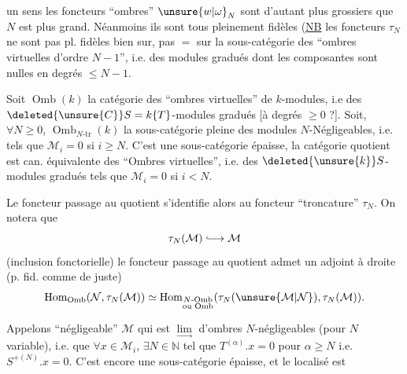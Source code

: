 un sens les foncteurs ``ombres'' $\unsure{w|\omega}_N$ sont d'autant plus grossiers que $N$ est plus grand. Néanmoins ils sont tous pleinement fidèles (\uline{NB} les foncteurs $\tau_N$ ne sont pas pl. fidèles bien sur, pas $=$ sur la sous-catégorie des ``ombres virtuelles d'ordre $N-1$'', i.e. des modules gradués dont les composantes sont nulles en degrés $\leq N-1$.

Soit $\operatorname{Omb}(k)$ la catégorie des ``ombres virtuelles'' de $k$-modules, i.e des $\deleted{\unsure{C}}S=k\{T\}$-modules gradués [à degrés $\geq0$ ?]. Soit, $\forall N\geq0$, $\operatorname{Omb}_{N\text{-}\mathrm{tr}}(k)$ la sous-catégorie pleine des modules $N$-Négligeables, i.e. tels que $\mathcal M_i=0$ si $i\geq N$. C'est une sous-catégorie épaisse, la catégorie quotient est can. équivalente   des ``Ombres virtuelles'', i.e. des $\deleted{\unsure{k}}S$-modules gradués tels que $\mathcal M_i=0$ si $i<N$.

Le foncteur passage au quotient s'identifie alors au foncteur ``troncature'' $\tau_N$. On notera que
\[
\tau_N(\mathcal M)\lhook\joinrel\longrightarrow\mathcal M
\]
(inclusion fonctorielle)  le foncteur  passage au quotient admet un adjoint à droite (p. fid. comme de juste)
\[
\operatorname{Hom}_{\mathrm{Omb}}(\mathcal N,\tau_N(\mathcal M))\simeq\operatorname{Hom}_{\substack{N\text{-}\mathrm{Omb}\\\text{ou }\mathrm{Omb}}}(\tau_N(\unsure{\mathcal M|\mathcal N}),\tau_N(\mathcal M)).
\]

Appelons ``négligeable''  $\mathcal M$ qui est $\underset{\longrightarrow}{\lim}$  d'ombres $N$-négligeables (pour $N$ variable), i.e.  que  $\forall x\in\mathcal M_i$, $\exists N\in\mathbb{N}$ tel que $T^{(\alpha)}.x=0$ pour $\alpha\geq N$ i.e. $S^{+(N)}.x=0$. C'est encore une sous-catégorie épaisse, et le localisé est

